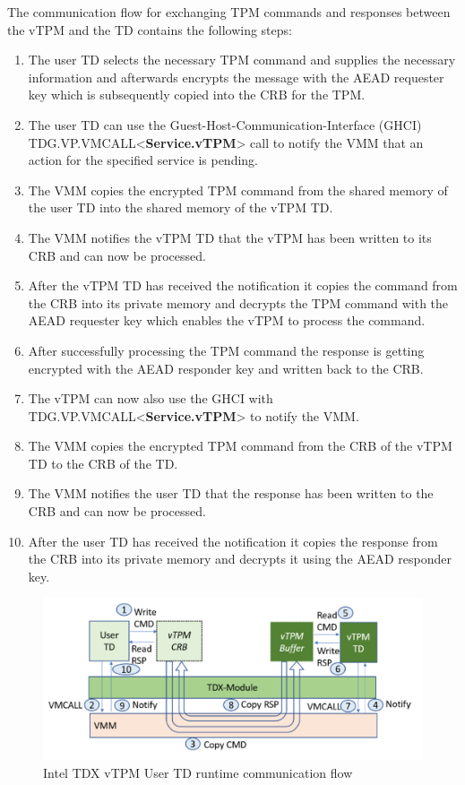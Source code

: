 \documentclass[sigplan,screen,nonacm]{acmart}
\begin{document}
The communication flow for exchanging TPM commands and responses between the vTPM and the TD contains the following steps:
\begin{enumerate}
    \item The user TD selects the necessary TPM command and supplies the necessary information and afterwards encrypts the message with the AEAD requester key which is subsequently copied into the CRB for the TPM.
    \item The user TD can use the Guest-Host-Communication-Interface (GHCI) TDG.VP.VMCALL<\textbf{Service.vTPM}> call to notify the VMM that an action for the specified service is pending.
    \item The VMM copies the encrypted TPM command from the shared memory of the user TD into the shared memory of the vTPM TD.
    \item The VMM notifies the vTPM TD that the vTPM has been written to its CRB and can now be processed.
    \item After the vTPM TD has received the notification it copies the command from the CRB into its private memory and decrypts the TPM command with the AEAD requester key which enables the vTPM to process the command.
    \item After successfully processing the TPM command the response is getting encrypted with the AEAD responder key and written back to the CRB.
    \item The vTPM can now also use the GHCI with \\TDG.VP.VMCALL<\textbf{Service.vTPM}> to notify the VMM.
    \item The VMM copies the encrypted TPM command from the CRB of the vTPM TD to the CRB of the TD.
    \item The VMM notifies the user TD that the response has been written to the CRB and can now be processed.
    \item After the user TD has received the notification it copies the response from the CRB into its private memory and decrypts it using the AEAD responder key. 
\end{enumerate}

\begin{figure}
  \centering
  \includegraphics[width=\linewidth]{pictures/vTPM_communication.png}
  \caption{Intel TDX vTPM User TD runtime communication flow \cite{Intel-vTPM}}
  \label{fig:vtpmcommunication}
\end{figure}
\end{document}
